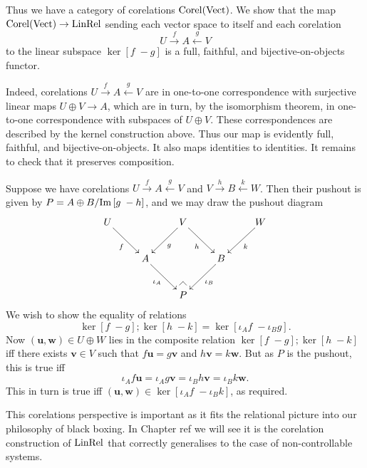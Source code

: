 Thus we have a category of corelations $\operatorname{{Corel}}(\mathrm{Vect})$. We show that the map
$\operatorname{{Corel}}(\mathrm{Vect}) \to \mathrm{LinRel}$ sending each vector space to itself and each
corelation
\[
  U \xrightarrow{f} A \xleftarrow{g} V
\]
to the linear subspace $\ker[f\;-g]$ is a full, faithful, and
bijective-on-objects functor.

Indeed, corelations $U \xrightarrow{f} A \xleftarrow{g} V$ are in one-to-one
correspondence with surjective linear maps $U\oplus V \to A$, which are in
turn, by the isomorphism theorem, in one-to-one correspondence with subspaces
of $U\oplus V$. These correspondences are described by the kernel construction
above. Thus our map is evidently full, faithful, and bijective-on-objects. It
also maps identities to identities. It remains to check that it preserves
composition.

Suppose we have corelations $U \xrightarrow{f} A \xleftarrow{g} V$
and $V \xrightarrow{h} B \xleftarrow{k} W$. Then their pushout is given by
$P=A \oplus B/\mathrm{Im}\,[g\;-h]$, and we may draw the pushout diagram
\[
  \xymatrix{
    U \ar[dr]_{f} & & V \ar[dl]^{g}  
    \ar[dr]_{h} & & W \ar[dl]^{k} {} 
    \\
    & A \ar[dr]_{\iota_A} & & B \ar[dl]^{\iota_B}  \\
    & & P {\save*!<0cm,-.5cm>[dl]@^{|-}\restore}
  }
\]
We wish to show the equality of relations
\[
  \ker[f\;-g];\ker[h\;-k] = \ker[\iota_A f\; -\iota_B g].
\]
Now $(\mathbf{u},\mathbf{w}) \in U \oplus W$ lies in the composite relation
$\ker[f\;-g];\ker[h\;-k]$ iff there exists $\mathbf{v} \in V$ such that
$f\mathbf{u} = g\mathbf{v}$ and $h\mathbf{v} = k\mathbf{w}$. But as $P$ is the
pushout, this is true iff 
\[
  \iota_A f \mathbf{u} = \iota_A g \mathbf{v} = \iota_B h \mathbf{v} =
  \iota_B k \mathbf{w}.
\]
This in turn is true iff $(\mathbf{u}, \mathbf{w}) \in \ker[\iota_Af\;
-\iota_Bk]$, as required. 

This corelations perspective is important as it fits the relational picture into
our philosophy of black boxing. In Chapter ref we will see it is the corelation
construction of $\mathrm{LinRel}$ that correctly generalises to the case of
non-controllable systems.


